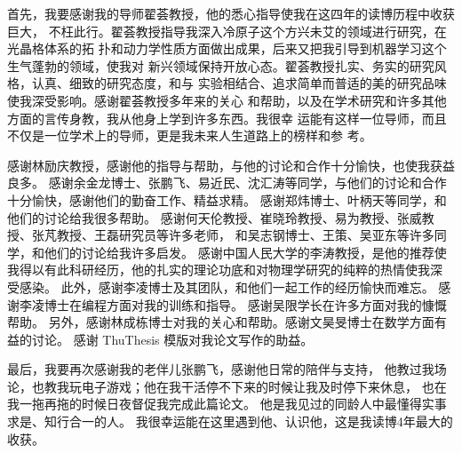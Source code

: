 \begin{acknowledgement}

首先，我要感谢我的导师翟荟教授，他的悉心指导使我在这四年的读博历程中收获巨大，
不枉此行。翟荟教授指导我深入冷原子这个方兴未艾的领域进行研究，在光晶格体系的拓
扑和动力学性质方面做出成果，后来又把我引导到机器学习这个生气蓬勃的领域，使我对
新兴领域保持开放心态。翟荟教授扎实、务实的研究风格，认真、细致的研究态度，和与
实验相结合、追求简单而普适的美的研究品味使我深受影响。感谢翟荟教授多年来的关心
和帮助，以及在学术研究和许多其他方面的言传身教，我从他身上学到许多东西。我很幸
运能有这样一位导师，而且不仅是一位学术上的导师，更是我未来人生道路上的榜样和参
考。

感谢林励庆教授，感谢他的指导与帮助，与他的讨论和合作十分愉快，也使我获益良多。
感谢余金龙博士、张鹏飞、易近民、沈汇涛等同学，与他们的讨论和合作十分愉快，感谢他们的勤奋工作、精益求精。
感谢郑炜博士、叶柄天等同学，和他们的讨论给我很多帮助。
感谢何天伦教授、崔晓玲教授、易为教授、张威教授、张芃教授、王磊研究员等许多老师，
和吴志钢博士、王策、吴亚东等许多同学，和他们的讨论给我许多启发。
感谢中国人民大学的李涛教授，是他的推荐使我得以有此科研经历，他的扎实的理论功底和对物理学研究的纯粹的热情使我深
受感染。
此外，感谢李凌博士及其团队，和他们一起工作的经历愉快而难忘。
感谢李凌博士在编程方面对我的训练和指导。
感谢吴限学长在许多方面对我的慷慨帮助。
另外，感谢林成栋博士对我的关心和帮助。感谢文昊旻博士在数学方面有益的讨论。
感谢 ThuThesis 模版对我论文写作的助益。

最后，我要再次感谢我的老伴儿张鹏飞，感谢他日常的陪伴与支持，
他教过我场论，也教我玩电子游戏；他在我干活停不下来的时候让我及时停下来休息，
也在我一拖再拖的时候日夜督促我完成此篇论文。
他是我见过的同龄人中最懂得实事求是、知行合一的人。
我很幸运能在这里遇到他、认识他，这是我读博4年最大的收获。

\end{acknowledgement}
